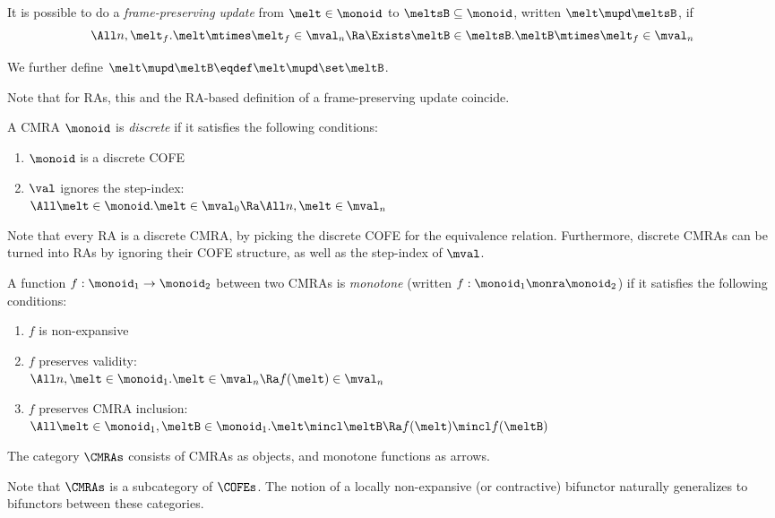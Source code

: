 \begin{defn}
  It is possible to do a \emph{frame-preserving update} from $\melt \in \monoid$ to $\meltsB \subseteq \monoid$, written $\melt \mupd \meltsB$, if
  \[ \All n, \melt_f. \melt \mtimes \melt_f \in \mval_n \Ra \Exists \meltB \in \meltsB. \meltB \mtimes \melt_f \in \mval_n \]

  We further define $\melt \mupd \meltB \eqdef \melt \mupd \set\meltB$.
\end{defn}
Note that for RAs, this and the RA-based definition of a frame-preserving update coincide.

\begin{defn}
  A CMRA $\monoid$ is \emph{discrete} if it satisfies the following conditions:
  \begin{enumerate}[itemsep=0pt]
  \item $\monoid$ is a discrete COFE
  \item $\val$ ignores the step-index: \\
    $\All \melt \in \monoid. \melt \in \mval_0 \Ra \All n, \melt \in \mval_n$
  \end{enumerate}
\end{defn}
Note that every RA is a discrete CMRA, by picking the discrete COFE for the equivalence relation.
Furthermore, discrete CMRAs can be turned into RAs by ignoring their COFE structure, as well as the step-index of $\mval$.

\begin{defn}
  A function $f : \monoid_1 \to \monoid_2$ between two CMRAs is \emph{monotone} (written $f : \monoid_1 \monra \monoid_2$) if it satisfies the following conditions:
  \begin{enumerate}[itemsep=0pt]
  \item $f$ is non-expansive
  \item $f$ preserves validity: \\
    $\All n, \melt \in \monoid_1. \melt \in \mval_n \Ra f(\melt) \in \mval_n$
  \item $f$ preserves CMRA inclusion:\\
    $\All \melt \in \monoid_1, \meltB \in \monoid_1. \melt \mincl \meltB \Ra f(\melt) \mincl f(\meltB)$
  \end{enumerate}
\end{defn}

\begin{defn}
  The category $\CMRAs$ consists of CMRAs as objects, and monotone functions as arrows.
\end{defn}
Note that $\CMRAs$ is a subcategory of $\COFEs$.
The notion of a locally non-expansive (or contractive) bifunctor naturally generalizes to bifunctors between these categories.


